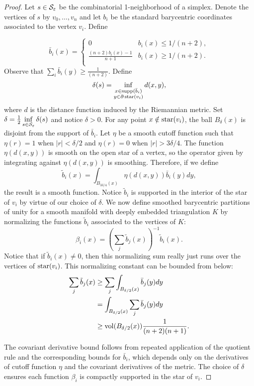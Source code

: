 \begin{proof}
Let $s\in\mathcal S_\varepsilon$ be the combinatorial 1-neighborhood of a simplex. Denote the vertices of $s$ by $v_0,\dots, v_n$ and let $b_i$ be the standard barycentric coordinates associated to the vertex $v_i$. Define

\[\bar b_i(x) =  \begin{cases}
       0 & b_i(x)\leq 1/(n+2), \\
       \frac{(n+2)b_i(x)-1}{n+1} & b_i(x) \geq 1/(n+2). \\

   \end{cases}
\] Observe that $\sum\limits_i \bar b_i(y) \geq \frac{1}{(n+2)}$. Define $$\delta(s) = \inf\limits_{\substack{x\in\operatorname*{supp}(\bar b_i)\\y\in \partial \operatorname{{\text{star}}}(v_i)}}d(x,y),$$ where $d$ is the distance function induced by the Riemannian metric.  Set $\delta = \frac{1}{2}\inf\limits_{s\in \mathcal S_\varepsilon} \delta(s)$ and notice $\delta>0$. For any point $x\notin \operatorname{{\text{star}}}(v_i)$, the ball $B_{\delta}(x)$ is disjoint from the support of $\bar b_i$.
Let $\eta$ be a smooth cutoff function such that $\eta(r) = 1$ when $|r|<\delta/2$ and $\eta(r) = 0$ when $|r|>3\delta/4$. The function $\eta(d(x,y))$ is smooth on the open star of a vertex, so the operator given by integrating against $\eta(d(x,y))$ is smoothing. Therefore, if we define $$\tilde b_i(x) = \int_{B_{3\delta/4}(x)}\eta(d(x,y))\bar b_i(y)dy,$$ the result is a smooth function.  Notice $\tilde b_i$ is supported in the interior of the star of $v_i$ by virtue of our choice of $\delta$. We now define smoothed barycentric partitions of unity for a smooth manifold with deeply embedded triangulation $K$ by normalizing the functions $\tilde b_i$ associated to the vertices of $K$:
$$\beta_i(x) = \left(\sum\limits_j \tilde b_j (x)\right)^{-1} \tilde b_i (x).$$ Notice that if $\tilde b_i(x)\neq 0$, then this normalizing sum really just runs over the vertices of $\operatorname{{\text{star}}}(v_i)$. This normalizing constant can be bounded from below:
\begin{align*}
    \sum\limits_j \tilde b_j(x) &\geq \sum\limits_j \int_{B_{\delta/2}(x)}\bar b_j(y)dy \\
    &= \int_{B_{\delta/2}(x)} \sum\limits_j\bar b_j(y)dy \\
    &\geq \operatorname{vol}(B_{\delta/2}(x))\frac{1}{(n+2)(n+1)}.
\end{align*}

The covariant derivative bound follows from repeated application of the quotient rule and the corresponding bounds for $\bar b_i$, which  depends only on the derivatives of cutoff function $\eta$ and the covariant derivatives of the metric. The choice of $\delta$ ensures each function $\beta_i$ is compactly supported in the star of $v_i$.
\end{proof}

